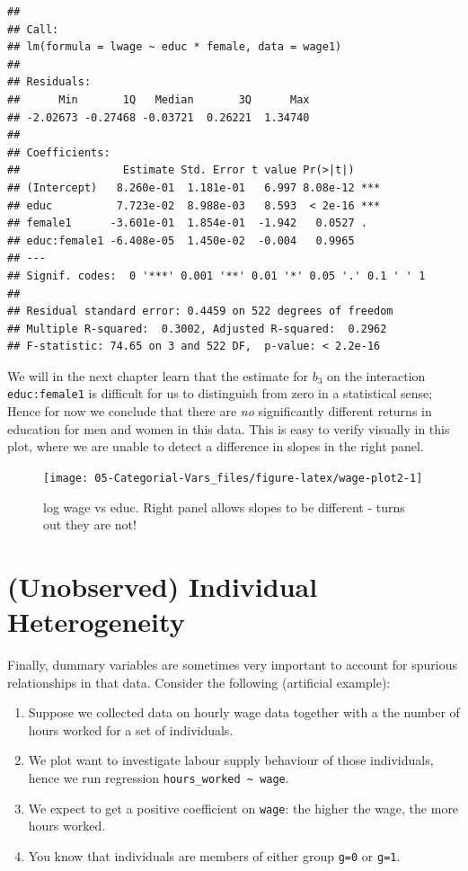 \documentclass[]{book}
\providecommand{\tightlist}{%
  \setlength{\itemsep}{0pt}\setlength{\parskip}{0pt}}
\begin{document}
\begin{verbatim}
## 
## Call:
## lm(formula = lwage ~ educ * female, data = wage1)
## 
## Residuals:
##      Min       1Q   Median       3Q      Max 
## -2.02673 -0.27468 -0.03721  0.26221  1.34740 
## 
## Coefficients:
##                Estimate Std. Error t value Pr(>|t|)    
## (Intercept)   8.260e-01  1.181e-01   6.997 8.08e-12 ***
## educ          7.723e-02  8.988e-03   8.593  < 2e-16 ***
## female1      -3.601e-01  1.854e-01  -1.942   0.0527 .  
## educ:female1 -6.408e-05  1.450e-02  -0.004   0.9965    
## ---
## Signif. codes:  0 '***' 0.001 '**' 0.01 '*' 0.05 '.' 0.1 ' ' 1
## 
## Residual standard error: 0.4459 on 522 degrees of freedom
## Multiple R-squared:  0.3002, Adjusted R-squared:  0.2962 
## F-statistic: 74.65 on 3 and 522 DF,  p-value: < 2.2e-16
\end{verbatim}

We will in the next chapter learn that the estimate for \(b_3\) on the
interaction \texttt{educ:female1} is difficult for us to distinguish
from zero in a statistical sense; Hence for now we conclude that there
are \emph{no} significantly different returns in education for men and
women in this data. This is easy to verify visually in this plot, where
we are unable to detect a difference in slopes in the right panel.

\begin{figure}

{\centering \texttt{[image: 05-Categorial-Vars\_files/figure-latex/wage-plot2-1]} 

}

\caption{log wage vs educ. Right panel allows slopes to be different - turns out they are not!}\label{fig:wage-plot2}
\end{figure}

\section{(Unobserved) Individual
Heterogeneity}\label{unobserved-individual-heterogeneity}

Finally, dummary variables are sometimes very important to account for
spurious relationships in that data. Consider the following (artificial
example):

\begin{enumerate}
\def\labelenumi{\arabic{enumi}.}
\tightlist
\item
  Suppose we collected data on hourly wage data together with a the
  number of hours worked for a set of individuals.
\item
  We plot want to investigate labour supply behaviour of those
  individuals, hence we run regression
  \texttt{hours\_worked\ \textasciitilde{}\ wage}.
\item
  We expect to get a positive coefficient on \texttt{wage}: the higher
  the wage, the more hours worked.
\item
  You know that individuals are members of either group \texttt{g=0} or
  \texttt{g=1}.
\end{enumerate}
\end{document}
